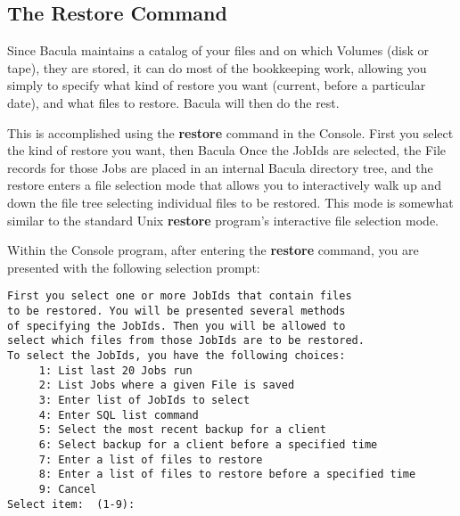 \subsection*{The Restore Command}

Since Bacula maintains a catalog of your files and on which Volumes (disk or
tape), they are stored, it can do most of the bookkeeping work, allowing you
simply to specify what kind of restore you want (current, before a particular
date), and what files to restore. Bacula will then do the rest. 

This is accomplished using the {\bf restore} command in the Console. First you
select the kind of restore you want, then Bacula Once the JobIds are selected,
the File records for those Jobs are placed in an internal Bacula directory
tree, and the restore enters a file selection mode that allows you to
interactively walk up and down the file tree selecting individual files to be
restored. This mode is somewhat similar to the standard Unix {\bf restore}
program's interactive file selection mode. 

Within the Console program, after entering the {\bf restore} command, you are
presented with the following selection prompt:  

\footnotesize
\begin{verbatim}
First you select one or more JobIds that contain files
to be restored. You will be presented several methods
of specifying the JobIds. Then you will be allowed to
select which files from those JobIds are to be restored.
To select the JobIds, you have the following choices:
     1: List last 20 Jobs run
     2: List Jobs where a given File is saved
     3: Enter list of JobIds to select
     4: Enter SQL list command
     5: Select the most recent backup for a client
     6: Select backup for a client before a specified time
     7: Enter a list of files to restore
     8: Enter a list of files to restore before a specified time
     9: Cancel
Select item:  (1-9):
     
\end{verbatim}
\normalsize

